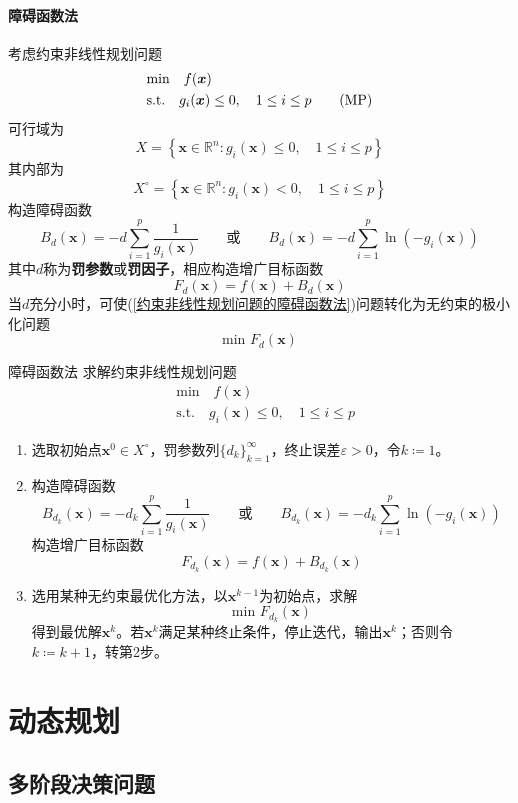 \documentclass[lang = cn, scheme = chinese, thmcnt = section]{elegantbook}
\newcommand{\R}{\mathbb{R}}            %
\newcommand{\bs}{\boldsymbol}          %
\begin{document}
\subsubsection{障碍函数法}

考虑约束非线性规划问题
\begin{align*}\label{约束非线性规划问题的障碍函数法}
	& \text{min}  \quad f(\bs{x})\\
	& \text{s.t.} \quad g_i(\bs{x})\le 0,\quad 1\le i \le p\tag{$\text{MP}$}
\end{align*}
可行域为
$$
X=\left\{ 
\bs{x}\in\R^n:g_i(\bs{x})\le 0,\quad 1\le i \le p
\right\}
$$
其内部为
$$
X^\circ=\left\{ 
\bs{x}\in\R^n:g_i(\bs{x})< 0,\quad 1\le i \le p
\right\}
$$
构造障碍函数%
$$
B_{d}(\bs{x})=-d\sum_{i=1}^{p}\frac{1}{g_i(\bs{x})}\qquad
\text{或}\qquad
B_{d}(\bs{x})=-d\sum_{i=1}^{p}\ln(-g_i(\bs{x}))
$$
其中$d$称为\textbf{罚参数}或\textbf{罚因子}，相应构造增广目标函数
$$
F_d(\bs{x})=f(\bs{x})+B_d(\bs{x})
$$
当$d$充分小时，可使(\ref{约束非线性规划问题的障碍函数法})问题转化为无约束的极小化问题%
$$
\text{min }F_d(\bs{x})
$$

\begin{theorem}{障碍函数法}
	求解约束非线性规划问题
	\begin{align*}
		& \text{min}  \quad f(\bs{x})\\
		& \text{s.t.} \quad g_i(\bs{x})\le 0,\quad 1\le i \le p
	\end{align*}
	\begin{enumerate}
		\item 选取初始点$\bs{x}^0\in X^\circ$，罚参数列$\{d_k\}_{k=1}^{\infty}$，终止误差$\varepsilon>0$，令$k\coloneqq1$。
		\item 构造障碍函数
		$$
		B_{d_k}(\bs{x})=-d_k\sum_{i=1}^{p}\frac{1}{g_i(\bs{x})}\qquad
		\text{或}\qquad
		B_{d_k}(\bs{x})=-d_k\sum_{i=1}^{p}\ln(-g_i(\bs{x}))
		$$
		构造增广目标函数
		$$
		F_{d_k}(\bs{x})=f(\bs{x})+B_{d_k}(\bs{x})
		$$
		\item 选用某种无约束最优化方法，以$\bs{x}^{k-1}$为初始点，求解%
		$$
		\text{min }F_{d_k}(\bs{x})
		$$
		得到最优解$\bs{x}^{k}$。若$\bs{x}^{k}$满足某种终止条件，停止迭代，输出$\bs{x}^k$；否则令$k\coloneqq k+1$，转第2步。
	\end{enumerate}
\end{theorem}

\chapter{动态规划}

\section{多阶段决策问题}
\end{document}

